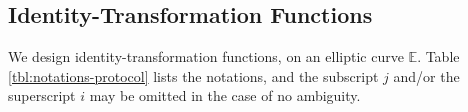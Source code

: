 

\subsection{Identity-Transformation Functions}
\label{subsec:overview}

We design identity-transformation functions,
    on an elliptic curve $\mathbb{E}$.
Table \ref{tbl:notations-protocol} lists the notations,
    and the subscript $j$ and/or the superscript $i$ may be omitted in the case of no ambiguity.


